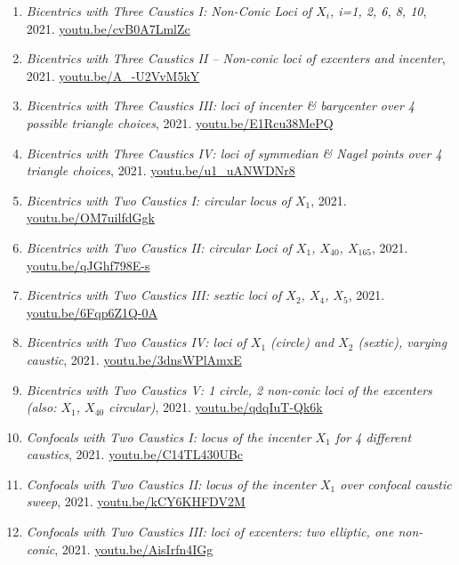 \documentclass[12pt]{article}
\begin{document}
\begin{enumerate}[resume]
\item \textit{Bicentrics with Three Caustics I: Non-Conic Loci of $X_i$, i=1, 2, 6, 8, 10}, 2021. \href{https://youtu.be/cvB0A7LmlZc}{\url{youtu.be/cvB0A7LmlZc}}
\item \textit{Bicentrics with Three Caustics II -- Non-conic loci of excenters and  incenter}, 2021. \href{https://youtu.be/A_-U2VvM5kY}{\url{youtu.be/A\_-U2VvM5kY}}
\item \textit{Bicentrics with Three Caustics III: loci of incenter \& barycenter over 4 possible triangle choices}, 2021. \href{https://youtu.be/E1Rcu38MePQ}{\url{youtu.be/E1Rcu38MePQ}}
\item \textit{Bicentrics with Three Caustics IV: loci of symmedian \& Nagel points over 4 triangle choices}, 2021. \href{https://youtu.be/u1_uANWDNr8}{\url{youtu.be/u1\_uANWDNr8}}
\item \textit{Bicentrics with Two Caustics I: circular locus of $X_{1}$}, 2021. \href{https://youtu.be/OM7uilfdGgk}{\url{youtu.be/OM7uilfdGgk}}
\item \textit{Bicentrics with Two Caustics II: circular Loci of $X_{1}$, $X_{40}$, $X_{165}$}, 2021. \href{https://youtu.be/qJGhf798E-s}{\url{youtu.be/qJGhf798E-s}}
\item \textit{Bicentrics with Two Caustics III: sextic loci of $X_{2}$, $X_{4}$, $X_{5}$}, 2021. \href{https://youtu.be/6Fqp6Z1Q-0A}{\url{youtu.be/6Fqp6Z1Q-0A}}
\item \textit{Bicentrics with Two Caustics IV: loci of $X_{1}$ (circle) and $X_{2}$ (sextic), varying caustic}, 2021. \href{https://youtu.be/3dnsWPlAmxE}{\url{youtu.be/3dnsWPlAmxE}}
\item \textit{Bicentrics with Two Caustics V: 1 circle, 2 non-conic loci of the excenters (also: $X_{1}$, $X_{40}$ circular)}, 2021. \href{https://youtu.be/qdqIuT-Qk6k}{\url{youtu.be/qdqIuT-Qk6k}}
\item \textit{Confocals with Two Caustics I: locus of the incenter $X_{1}$ for 4 different caustics}, 2021. \href{https://youtu.be/C14TL430UBc}{\url{youtu.be/C14TL430UBc}}
\item \textit{Confocals with Two Caustics II: locus of the incenter $X_{1}$ over confocal caustic sweep}, 2021. \href{https://youtu.be/kCY6KHFDV2M}{\url{youtu.be/kCY6KHFDV2M}}
\item \textit{Confocals with Two Caustics III: loci of excenters: two elliptic, one non-conic}, 2021. \href{https://youtu.be/AisIrfn4IGg}{\url{youtu.be/AisIrfn4IGg}}

\end{enumerate}
\end{document}
